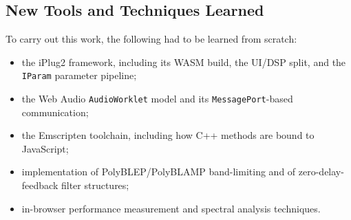 \subsection{New Tools and Techniques Learned}
\noindent
To carry out this work, the following had to be learned from scratch:
\begin{itemize}
  \item the iPlug2 framework, including its WASM build, the UI/DSP split, and the \texttt{IParam} parameter pipeline;
  \item the Web Audio \texttt{AudioWorklet} model and its \texttt{MessagePort}-based communication;
  \item the Emscripten toolchain, including how C++ methods are bound to JavaScript;
  \item implementation of PolyBLEP/PolyBLAMP band-limiting and of zero-delay-feedback filter structures\cite{PolyBLEP}\cite{PolyBLAMP}\cite{va_filter};
  \item in-browser performance measurement and spectral analysis techniques.
\end{itemize}